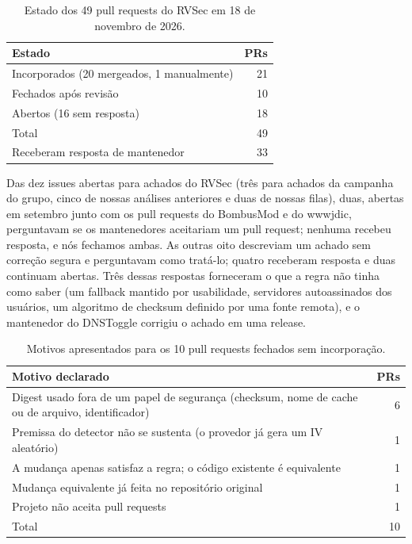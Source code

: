 \documentclass[conference]{IEEEtran}
\begin{document}
\begin{table}[H]
\centering
\caption{Estado dos 49 pull requests do RVSec em 18 de novembro de 2026.}
\label{tab:pr-state}
\begin{tabular}{lr}
\toprule
Estado & PRs \\
\midrule
Incorporados (20 mergeados, 1 manualmente) & 21 \\
Fechados após revisão                  & 10 \\
Abertos (16 sem resposta)            & 18 \\
\midrule
Total                                & 49 \\
Receberam resposta de mantenedor       & 33 \\
\bottomrule
\end{tabular}
\end{table}

Das dez issues abertas para achados do RVSec (três para achados da campanha
do grupo, cinco de nossas análises anteriores e duas de nossas filas), duas,
abertas em setembro junto com
os pull requests do BombusMod e do wwwjdic, perguntavam se os mantenedores aceitariam
um pull request; nenhuma recebeu resposta, e nós fechamos ambas. As outras
oito descreviam um achado sem correção segura e perguntavam como tratá-lo; quatro
receberam resposta e duas continuam abertas. Três dessas respostas forneceram o que
a regra não tinha como saber (um fallback mantido por usabilidade, servidores
autoassinados dos usuários, um algoritmo de checksum definido por uma fonte remota), e o mantenedor do DNSToggle
corrigiu o achado em uma release.

\begin{table}[H]
\centering
\caption{Motivos apresentados para os 10 pull requests fechados sem
incorporação.}
\label{tab:closures}
\footnotesize
\begin{tabular}{p{5.8cm}r}
\toprule
Motivo declarado & PRs \\
\midrule
Digest usado fora de um papel de segurança (checksum, nome de cache ou de arquivo,
identificador) & 6 \\
Premissa do detector não se sustenta (o provedor já gera um IV aleatório) & 1 \\
A mudança apenas satisfaz a regra; o código existente é equivalente & 1 \\
Mudança equivalente já feita no repositório original & 1 \\
Projeto não aceita pull requests & 1 \\
\midrule
Total & 10 \\
\bottomrule
\end{tabular}
\end{table}
\end{document}
